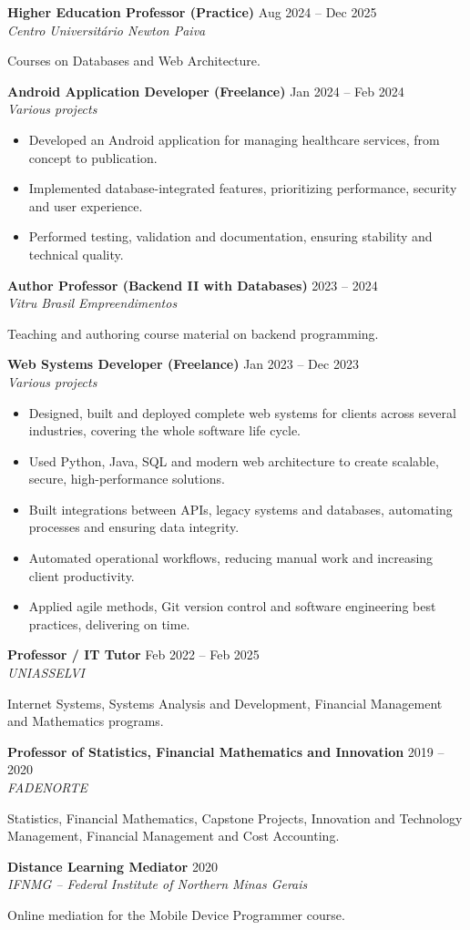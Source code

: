 \documentclass[a4paper,10pt]{article}
\newcommand{\job}[3]{\noindent\textbf{#1} \hfill #3\\\textit{#2}\par}
\begin{document}
\job{Higher Education Professor (Practice)}{Centro Universitário Newton Paiva}{Aug 2024 -- Dec 2025}
Courses on Databases and Web Architecture.

\medskip
\job{Android Application Developer (Freelance)}{Various projects}{Jan 2024 -- Feb 2024}
\begin{itemize}
    \item Developed an Android application for managing healthcare services, from concept to publication.
    \item Implemented database-integrated features, prioritizing performance, security and user experience.
    \item Performed testing, validation and documentation, ensuring stability and technical quality.
\end{itemize}

\job{Author Professor (Backend II with Databases)}{Vitru Brasil Empreendimentos}{2023 -- 2024}
Teaching and authoring course material on backend programming.

\medskip
\job{Web Systems Developer (Freelance)}{Various projects}{Jan 2023 -- Dec 2023}
\begin{itemize}
    \item Designed, built and deployed complete web systems for clients across several industries, covering the whole software life cycle.
    \item Used Python, Java, SQL and modern web architecture to create scalable, secure, high-performance solutions.
    \item Built integrations between APIs, legacy systems and databases, automating processes and ensuring data integrity.
    \item Automated operational workflows, reducing manual work and increasing client productivity.
    \item Applied agile methods, Git version control and software engineering best practices, delivering on time.
\end{itemize}

\job{Professor / IT Tutor}{UNIASSELVI}{Feb 2022 -- Feb 2025}
Internet Systems, Systems Analysis and Development, Financial Management and Mathematics programs.

\medskip
\job{Professor of Statistics, Financial Mathematics and Innovation}{FADENORTE}{2019 -- 2020}
Statistics, Financial Mathematics, Capstone Projects, Innovation and Technology Management, Financial Management and Cost Accounting.

\medskip
\job{Distance Learning Mediator}{IFNMG -- Federal Institute of Northern Minas Gerais}{2020}
Online mediation for the Mobile Device Programmer course.
\end{document}
